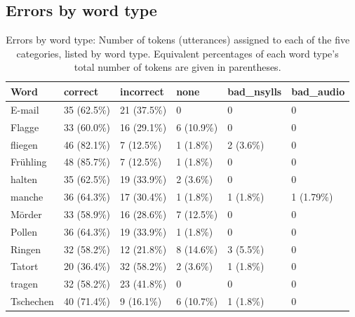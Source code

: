 		
		
		

		
		\subsection{Errors by word type}
		\label{sec:results:wordtype}
		

\begin{table}[tbp]
				\centering
				\caption[Errors by word type]{Errors by word type: Number of tokens (utterances) assigned to each of the five categories, listed by word type. Equivalent percentages of each word type's total number of tokens are given in parentheses.}
				\begin{tabularx}{\textwidth}{lXXXXX}
				\toprule
				Word & correct & incorrect & none & bad\_nsylls & bad\_audio \\	
					\midrule
E-mail 			&	35 (62.5\%)	& 21 (37.5\%) 	&	0 					&	0 				&  0  				\\
Flagge			& 33 (60.0\%)	&	16 (29.1\%)	&	6 (10.9\%)	&	0 		 		&	0 					\\
fliegen 			&	46 (82.1\%)	&	7 (12.5\%) 	&	1 (1.8\%) 		&	2 (3.6\%)	&	0 					\\
Fr\"{u}hling 	&	48 (85.7\%) 	&	7 (12.5\%) 	&	1 (1.8\%)		&	0 				&	0 					\\
halten 			&	35 (62.5\%)	&	19 (33.9\%)	&	2 (3.6\%)		&	0				&	0 					\\
manche		&	36 (64.3\%)	&	17 (30.4\%)	&	1 (1.8\%)		&	1 (1.8\%) 	&	1 (1.79\%)	\\
M\"{o}rder	& 33 (58.9\%)	&	16 (28.6\%)	&	7 (12.5\%)	&	0 				&	0 					\\
Pollen			& 36 (64.3\%)	&	19 (33.9\%)	&	1 (1.8\%)		&	0 				&	0 					\\
Ringen			& 32 (58.2\%)	&	12 (21.8\%)	&	8 (14.6\%)	&	3 (5.5\%)	&	0 					\\
Tatort			& 20 (36.4\%)	&	32 (58.2\%)	&	2 (3.6\%)		&	1 (1.8\%)	&	0 					\\
tragen			& 32 (58.2\%)	&	23 (41.8\%)	&	0 					&	0 				&	0 					\\
Tschechen 	&	40 (71.4\%)	&	9 (16.1\%)	 &	6 (10.7\%)	&	1 (1.8\%) 	&	0  				\\
					\bottomrule
				\end{tabularx}
				\label{tab:results:wordtype}
			\end{table}		
		
